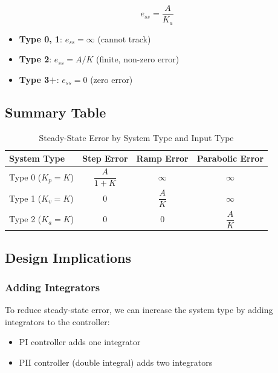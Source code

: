 \begin{equation}
    \boxed{e_{ss} = \frac{A}{K_a}}
\end{equation}

\begin{itemize}
    \item \textbf{Type 0, 1}: $e_{ss} = \infty$ (cannot track)
    \item \textbf{Type 2}: $e_{ss} = A/K$ (finite, non-zero error)
    \item \textbf{Type 3+}: $e_{ss} = 0$ (zero error)
\end{itemize}

\subsection{Summary Table}

\begin{table}[htbp]
\centering
\caption{Steady-State Error by System Type and Input Type}
\label{tab:steady_state_error}
\begin{tabular}{lccc}
\toprule
\textbf{System Type} & \textbf{Step Error} & \textbf{Ramp Error} & \textbf{Parabolic Error} \\
\midrule
Type 0 ($K_p = K$) & $\dfrac{A}{1+K}$ & $\infty$ & $\infty$ \\[1em]
Type 1 ($K_v = K$) & $0$ & $\dfrac{A}{K}$ & $\infty$ \\[1em]
Type 2 ($K_a = K$) & $0$ & $0$ & $\dfrac{A}{K}$ \\
\bottomrule
\end{tabular}
\end{table}


\subsection{Design Implications}

\subsubsection{Adding Integrators}

To reduce steady-state error, we can increase the system type by adding integrators to the controller:
\begin{itemize}
    \item PI controller adds one integrator
    \item PII controller (double integral) adds two integrators
\end{itemize}

